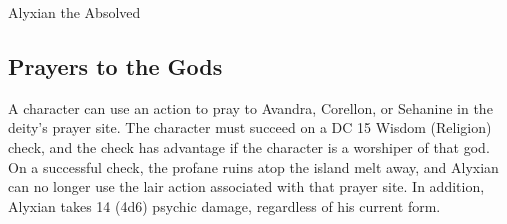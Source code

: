 \documentclass[10pt,a4paper,twoside,twocolumn,openany,nodeprecatedcode]{dndbook}
\begin{document}
\begin{DndMonster}[float=ht]{Alyxian the Absolved}
\subsection{Prayers to the Gods}
A character can use an action to pray to Avandra, Corellon, or Sehanine in the deity's prayer site. The character must succeed on a DC 15 Wisdom (Religion) check, and the check has advantage if the character is a worshiper of that god. On a successful check, the profane ruins atop the island melt away, and Alyxian can no longer use the lair action associated with that prayer site. In addition, Alyxian takes 14 (4d6) psychic damage, regardless of his current form.

\end{DndMonster}


\clearpage
{}
\end{document}
